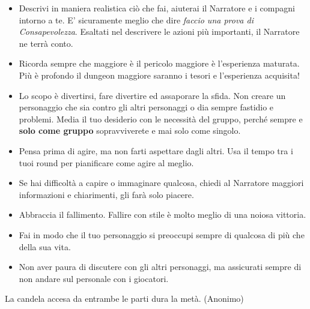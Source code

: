 \begin{multicols}{2}
\begin{itemize}[leftmargin=*]
\item
Descrivi in maniera realistica ciò che fai, aiuterai il Narratore e i compagni intorno a te. E' sicuramente meglio che dire \emph{faccio una prova di Consapevolezza}. Esaltati nel descrivere le azioni più importanti, il Narratore ne terrà conto.


\item
Ricorda sempre che maggiore è il pericolo maggiore è l'esperienza maturata. Più è profondo il dungeon maggiore saranno i tesori e l'esperienza acquisita!

\item
Lo scopo è divertirsi, fare divertire ed assaporare la sfida. Non creare un personaggio che sia contro gli altri personaggi o dia sempre fastidio e problemi. Media il tuo desiderio con le necessità del gruppo, perché sempre e \textbf{solo come gruppo} sopravviverete e mai solo come singolo.

\item
Pensa prima di agire, ma non farti aspettare dagli altri. Usa il tempo tra i tuoi round per pianificare come agire al meglio.

\item
Se hai difficoltà a capire o immaginare qualcosa, chiedi al Narratore maggiori informazioni e chiarimenti, gli farà solo piacere.

\item
Abbraccia il fallimento. Fallire con stile è molto meglio di una noiosa vittoria.

\item
Fai in modo che il tuo personaggio si preoccupi sempre di qualcosa di più che della sua vita.

\item
Non aver paura di discutere con gli altri personaggi, ma assicurati sempre di non andare sul personale con i giocatori.

\end{itemize}

\end{multicols}

\vfill

\begin{changemargin}{0.3cm}{0.3cm}\begin{enfasi}{
\begin{center}
La candela accesa da entrambe le parti dura la metà. (Anonimo)
\end{center}
}\end{enfasi}\end{changemargin}



